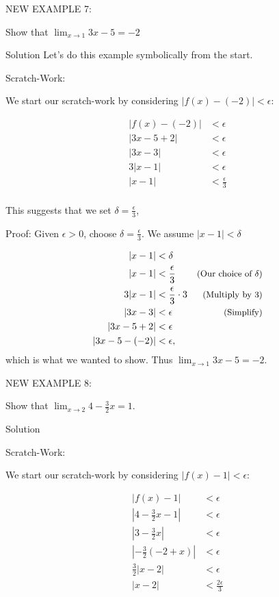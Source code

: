 \documentclass[10pt]{article}
\newcommand{\ds}{\displaystyle}
\begin{document}
NEW EXAMPLE 7:

Show that $\ds \lim_{x\to 1} {3x-5}=-2$

Solution    Let's do this example symbolically from the start.

Scratch-Work:
 
We start our scratch-work by considering $|f(x)-(-2)|<\epsilon$:

\begin{align*}
|f(x)-(-2)|&<\epsilon \\
|3x-5+2|&<\epsilon \\
|3x-3|&<\epsilon\\
3|x-1|&<\epsilon \\
|x-1|&<\frac{\epsilon}{3}\\
\end{align*}

This suggests that we set $\delta=\frac{\epsilon}{3}$,

Proof:
Given $\epsilon>0$, choose $\ds \delta=\frac{\epsilon}{3}$. We assume $|x-1|<\delta$

\small
\begin{align*}
|x - 1| &< \delta &\\
|x - 1| &< \frac{\epsilon}{3}&  \text{\small(Our choice of $\delta$)}\\
3|x - 1| &< \frac{\epsilon}{3}\cdot 3 &  \text{\small(Multiply by 3)}\\
|3x-3|&< \epsilon &  \text{\small(Simplify)}\\
|3x-5+2|&< \epsilon & \\
|3x-5-(-2)|&< \epsilon, & \\
\end{align*}
\normalsize
which is what we wanted to show. Thus  $\ds \lim_{x\to 1} {3x-5}=-2$.

NEW EXAMPLE 8:

Show that $\ds \lim_{x\to 2} 4-\frac{3}{2}x=1$.

Solution   

Scratch-Work:
 
We start our scratch-work by considering $|f(x)-1|<\epsilon$:

\begin{align*}
|f(x)-1|&<\epsilon \\
|4-\frac{3}{2}x-1|&<\epsilon \\
|3-\frac{3}{2}x|&<\epsilon\\
|-\frac{3}{2}(-2+x)|&<\epsilon \\
\frac{3}{2}|x-2|&<\epsilon \\
|x-2|&<\frac{2\epsilon}{3}\\
\end{align*}
\end{document}
